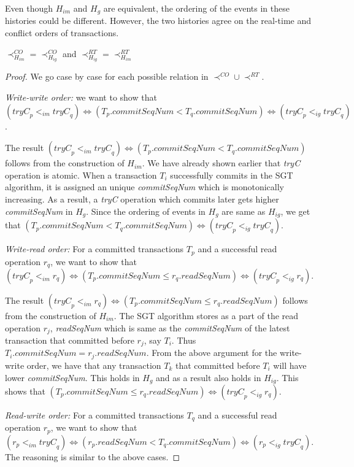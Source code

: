 \documentclass{llncs}
\newcommand{\op} {operation}
\newcommand{\cseq} {\textit{commitSeqNum}}
\newcommand{\rseq} {\textit{readSeqNum}}
\newcommand{\tryc} {\textit{tryC}}
\newcommand{\sgt} {SGT}
\begin{document}
Even though $H_{im}$ and $H_{g}$ are equivalent, the ordering of the
events in these histories could be different. 
However, the two histories agree on the real-time and conflict orders
of transactions.
\begin{lemma}
\label{lem:orders}
$\prec_{H_{im}}^{CO}=\prec_{H_{ig}}^{CO}$ and $\prec_{H_{ig}}^{RT}=\prec_{H_{im}}^{RT}$
\end{lemma}
\begin{proof}
We go case by case for each possible relation in $\prec^{CO}\cup\prec^{RT}$.

\noindent
\emph{Write-write order:} we want to show that 
$(\tryc_p <_{im} \tryc_q) \Leftrightarrow (T_p.\cseq < T_q.\cseq) \Leftrightarrow (\tryc_p <_{ig} \tryc_q)$.

The result $(\tryc_p <_{im} \tryc_q) \Leftrightarrow (T_p.\cseq < T_q.\cseq)$ follows from the construction of $H_{im}$. We have already shown earlier that \tryc{} \op{} is atomic. When a transaction $T_i$ successfully commits in the \sgt{} algorithm, it is assigned an unique \cseq{} which is monotonically increasing. As a result, a \tryc{} \op{} which commits later gets higher \cseq{} in $H_g$. Since the ordering of events in $H_g$ are same as $H_{ig}$, we get that $(T_p.\cseq < T_q.\cseq) \Leftrightarrow (\tryc_p <_{ig} \tryc_q)$. 

\noindent
\emph{Write-read order:} For a committed transactions $T_p$ and a
successful read \op{} 
$r_q$, we want to show that 
$(\tryc_p <_{im} r_q) \Leftrightarrow (T_p.\cseq \leq r_q.\rseq) \Leftrightarrow (\tryc_p <_{ig} r_q)$.

The result $(\tryc_p <_{im} r_q) \Leftrightarrow (T_p.\cseq \leq
r_q.\rseq)$ follows from 
the construction of $H_{im}$. The \sgt{} algorithm stores as a part of
the read \op{} $r_j$,  \rseq{}  which is same as the \cseq{} of the
latest transaction that  committed before $r_j$, say $T_i$. Thus
$T_i.\cseq = r_j.\rseq$.  From the above argument for the write-write
order, we have that  any transaction $T_k$ that committed before $T_i$
will have lower  \cseq. This holds in $H_g$ and as a result also holds
in $H_{ig}$.  This shows that $(T_p.\cseq \leq r_q.\rseq) \Leftrightarrow (\tryc_p <_{ig} r_q)$.

\noindent
\emph{Read-write order:} For a committed transactions $T_q$ and a successful read \op{} $r_p$, we want to show that $(r_p <_{im} \tryc_q) \Leftrightarrow (r_p.\rseq < T_q.\cseq) \Leftrightarrow (r_p <_{ig} \tryc_q)$. The reasoning is similar to the above cases. 


\end{proof}
\end{document}
